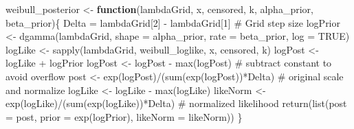 \documentclass[
  letterpaper,
  DIV=11,
  numbers=noendperiod]{scrartcl}
\newenvironment{Shaded}{\begin{snugshade}}{\end{snugshade}}
\newcommand{\AttributeTok}[1]{\textcolor[rgb]{0.40,0.45,0.13}{#1}}
\newcommand{\CommentTok}[1]{\textcolor[rgb]{0.37,0.37,0.37}{#1}}
\newcommand{\ConstantTok}[1]{\textcolor[rgb]{0.56,0.35,0.01}{#1}}
\newcommand{\ControlFlowTok}[1]{\textcolor[rgb]{0.00,0.23,0.31}{\textbf{#1}}}
\newcommand{\DecValTok}[1]{\textcolor[rgb]{0.68,0.00,0.00}{#1}}
\newcommand{\FunctionTok}[1]{\textcolor[rgb]{0.28,0.35,0.67}{#1}}
\newcommand{\NormalTok}[1]{\textcolor[rgb]{0.00,0.23,0.31}{#1}}
\newcommand{\OtherTok}[1]{\textcolor[rgb]{0.00,0.23,0.31}{#1}}
\newcommand{\SpecialCharTok}[1]{\textcolor[rgb]{0.37,0.37,0.37}{#1}}
\begin{document}
\begin{tcolorbox}
\begin{Shaded}
\begin{Highlighting}[]
\NormalTok{weibull\_posterior }\OtherTok{\textless{}{-}} \ControlFlowTok{function}\NormalTok{(lambdaGrid, x, censored, k, alpha\_prior, beta\_prior)\{}
\NormalTok{  Delta }\OtherTok{=}\NormalTok{ lambdaGrid[}\DecValTok{2}\NormalTok{] }\SpecialCharTok{{-}}\NormalTok{ lambdaGrid[}\DecValTok{1}\NormalTok{] }\CommentTok{\# Grid step size}
\NormalTok{  logPrior }\OtherTok{\textless{}{-}} \FunctionTok{dgamma}\NormalTok{(lambdaGrid, }\AttributeTok{shape =}\NormalTok{ alpha\_prior, }\AttributeTok{rate =}\NormalTok{ beta\_prior, }\AttributeTok{log =} \ConstantTok{TRUE}\NormalTok{)}
\NormalTok{  logLike }\OtherTok{\textless{}{-}} \FunctionTok{sapply}\NormalTok{(lambdaGrid, weibull\_loglike, x, censored, k)}
\NormalTok{  logPost }\OtherTok{\textless{}{-}}\NormalTok{ logLike }\SpecialCharTok{+}\NormalTok{ logPrior}
\NormalTok{  logPost }\OtherTok{\textless{}{-}}\NormalTok{ logPost }\SpecialCharTok{{-}} \FunctionTok{max}\NormalTok{(logPost) }\CommentTok{\# subtract constant to avoid overflow}
\NormalTok{  post }\OtherTok{\textless{}{-}} \FunctionTok{exp}\NormalTok{(logPost)}\SpecialCharTok{/}\NormalTok{(}\FunctionTok{sum}\NormalTok{(}\FunctionTok{exp}\NormalTok{(logPost))}\SpecialCharTok{*}\NormalTok{Delta) }\CommentTok{\# original scale and normalize}
\NormalTok{  logLike }\OtherTok{\textless{}{-}}\NormalTok{ logLike }\SpecialCharTok{{-}} \FunctionTok{max}\NormalTok{(logLike)}
\NormalTok{  likeNorm }\OtherTok{\textless{}{-}} \FunctionTok{exp}\NormalTok{(logLike)}\SpecialCharTok{/}\NormalTok{(}\FunctionTok{sum}\NormalTok{(}\FunctionTok{exp}\NormalTok{(logLike))}\SpecialCharTok{*}\NormalTok{Delta) }\CommentTok{\# normalized likelihood}
  \FunctionTok{return}\NormalTok{(}\FunctionTok{list}\NormalTok{(}\AttributeTok{post =}\NormalTok{ post, }\AttributeTok{prior =} \FunctionTok{exp}\NormalTok{(logPrior), }\AttributeTok{likeNorm =}\NormalTok{ likeNorm))}
\NormalTok{\}}
\end{Highlighting}
\end{Shaded}

\begin{Shaded}
\end{Shaded}
\end{tcolorbox}
\end{document}
